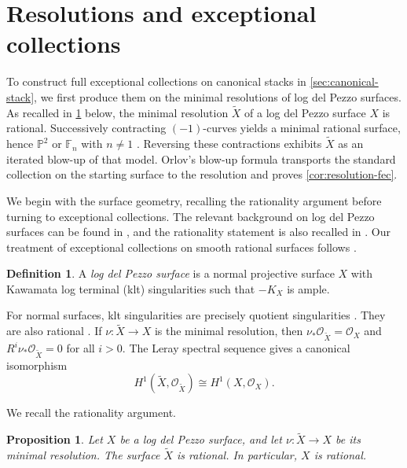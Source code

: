 \documentclass[11pt]{article}
\theoremstyle{plain}
\newtheorem{proposition}[proposition]{Proposition}
\theoremstyle{definition}
\newtheorem{definition}[definition]{Definition}
\theoremstyle{remark}
\newcommand{\Pp}{\mathbb P}
\newcommand{\F}{\mathbb F}
\newcommand{\OO}{\mathcal O}
\begin{document}
\section{Resolutions and exceptional collections}
\label{sec:rationality}
\label{sec:orlov}

To construct full exceptional collections on canonical stacks in
\cref{sec:canonical-stack}, we first produce them on the minimal
resolutions of log del Pezzo surfaces. As recalled in
\cref{prop:log-del-pezzo-rational} below, the minimal resolution
\(\widetilde X\) of a log del Pezzo surface \(X\) is rational.
Successively contracting \((-1)\)-curves yields a minimal rational surface,
hence \(\Pp^2\) or \(\F_n\) with \(n\neq1\) \cite[Theorem~V.10]{Beauville1996}.
Reversing these contractions exhibits \(\widetilde X\) as an iterated
blow-up of that model. Orlov's blow-up formula transports the standard
collection on the starting surface to the resolution and proves
\cref{cor:resolution-fec}.

We begin with the surface geometry, recalling the rationality argument
before turning to exceptional collections. The relevant background on
log del Pezzo surfaces can be found in \cite{AlexeevNikulin},
and the rationality statement is also recalled in
\cite[Remark~4.3]{GugiattiRota2023}. Our treatment of exceptional
collections on smooth rational surfaces follows \cite{HillePerling2011}.

\begin{definition}
A \emph{log del Pezzo surface} is a normal projective surface \(X\) with
Kawamata log terminal (klt) singularities such that \(-K_X\) is ample.
\end{definition}

For normal surfaces, klt singularities are precisely quotient singularities \cite[Proposition~4.18]{Kollar1998}. They are also rational \cite[Theorem~5.22]{Kollar1998}. If \(\nu:\widetilde X\to X\) is the minimal resolution, then \(\nu_*\OO_{\widetilde X}=\OO_X\) and \(R^i \nu_*\OO_{\widetilde X}=0\) for all \(i>0\). The Leray spectral sequence gives a canonical isomorphism
\[
H^1(\widetilde X,\OO_{\widetilde X})
\cong
H^1(X,\OO_X).
\]

We recall the rationality argument.

\begin{proposition}\label{prop:log-del-pezzo-rational}
Let \(X\) be a log del Pezzo surface, and let \(\nu:\widetilde X\to X\) be its minimal resolution. The surface \(\widetilde X\) is rational. In particular, \(X\) is rational.
\end{proposition}
\end{document}
